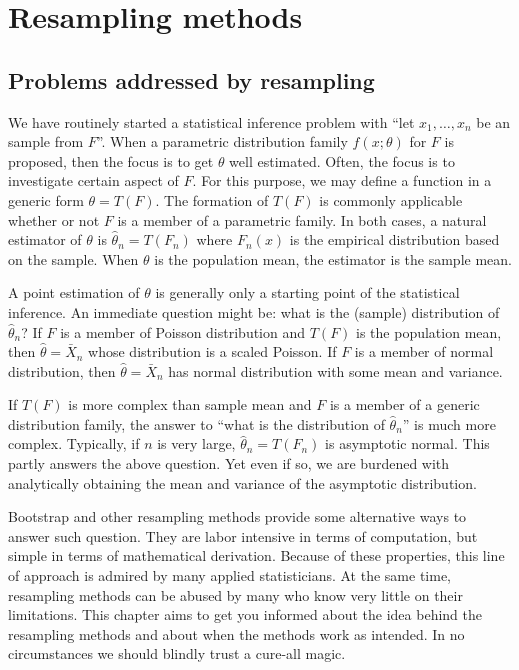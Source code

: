 \chapter{Resampling methods}

\section{Problems addressed by resampling}

We have routinely started a statistical inference problem with
``let $x_1, \ldots, x_n$ be an \iid sample from $F$''.
When a parametric distribution family $f(x; \theta)$
for $F$ is proposed,
then the focus is to get $\theta$ well estimated.
Often, the focus is to investigate certain aspect of $F$.
For this purpose, we may define a function in a generic form $\theta = T(F)$.
The formation of $T(F)$ is commonly applicable whether or
not $F$ is a member of a parametric family. In both cases,
a natural estimator of $\theta$ is $\hat \theta_n = T(F_n)$ where
$F_n(x)$ is the empirical distribution based on the \iid sample.
When $\theta$ is the population mean, 
the estimator is the sample mean.

A point estimation of $\theta$ is generally only a starting point
of the statistical inference. An immediate question might be:
what is the (sample) distribution of $\hat \theta_n$?
If $F$ is a member of Poisson distribution and $T(F)$ is the population
mean, then $\hat \theta = \bar X_n$ whose distribution is a scaled Poisson.  
If $F$ is a member of normal distribution, then 
$\hat \theta = \bar X_n$ has normal distribution 
with some mean and variance.

If $T(F)$ is more complex than sample mean and $F$ is 
a member of a generic distribution family, the answer to 
``what is the distribution of $\hat \theta_n$'' is much more complex.
Typically, if $n$ is very large, $\hat \theta_n = T(F_n)$ is asymptotic
normal. This partly answers the above question.
Yet even if so, we are burdened with analytically obtaining
the mean and variance of the asymptotic distribution.

Bootstrap and other resampling methods provide some alternative 
ways to answer such question.
They are labor intensive in terms of computation, but 
simple in terms of mathematical derivation. 
Because of these properties, this line of approach is admired by 
many applied statisticians.
At the same time, resampling methods can be abused by many who know very
little on their limitations. This chapter aims to get you informed about
the idea behind the resampling methods and about when
the methods work as intended. In no circumstances we should
blindly trust a cure-all magic.

